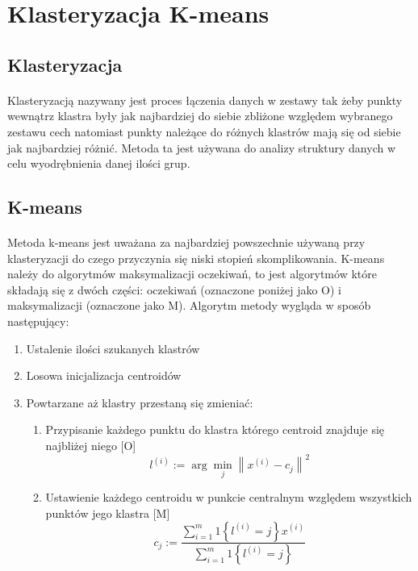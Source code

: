 \section{Klasteryzacja K-means}
\subsection{Klasteryzacja}
\paragraph{}
Klasteryzacją nazywany jest proces łączenia danych w zestawy tak żeby punkty wewnątrz klastra były jak najbardziej do siebie zbliżone względem wybranego zestawu cech natomiast punkty należące do różnych klastrów mają się od siebie jak najbardziej różnić. Metoda ta jest używana do analizy struktury danych w celu wyodrębnienia danej ilości grup.
\subsection{K-means}
\paragraph{}
Metoda k-means jest uważana za najbardziej powszechnie używaną przy klasteryzacji do czego przyczynia się niski stopień skomplikowania. K-means należy do algorytmów maksymalizacji oczekiwań, to jest algorytmów które składają się z dwóch części: oczekiwań (oznaczone poniżej jako O) i maksymalizacji (oznaczone jako M). Algorytm metody wygląda w sposób następujący:
\begin{enumerate}
	\item Ustalenie ilości szukanych klastrów
	\item Losowa inicjalizacja centroidów
	\item Powtarzane aż klastry przestaną się zmieniać:
	\begin{enumerate}
		\item Przypisanie każdego punktu do klastra którego centroid znajduje się najbliżej niego [O]\\
		\begin{equation}
			l^{(i)} := \arg \underset{j}{\min} \left \| x^{(i)} - c_{j} \right \|^{2}
		\end{equation}
		\item Ustawienie każdego centroidu w punkcie centralnym względem wszystkich punktów jego klastra [M]\\
		\begin{equation}
			c_{j} := \frac{\sum_{i=1}^{m}1\left \{ l^{(i)}=j \right \}x^{(i)}}{\sum_{i=1}^{m}1\left \{ l^{(i)}=j \right \}}
		\end{equation}
	\end{enumerate}
\end{enumerate}
